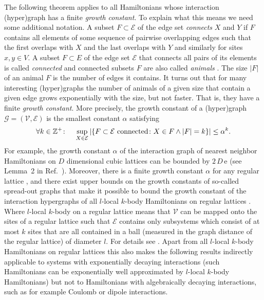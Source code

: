 \documentclass[a4paper,12pt,listof=totoc,index=totoc,bibliography=totoc,headsepline=false,headings=normal,BCOR16.153846mm,DIV12,headinclude,twoside,cleardoublepage=empty,numbers=noenddot,final]{scrreprt}
\theoremstyle{mystyle}
\numberwithin{equation}{section}
\numberwithin{figure}{section}
\numberwithin{lemma}{section}
\numberwithin{theorem}{section}
\numberwithin{corollary}{section}
\numberwithin{definition}{section}
\numberwithin{conjecture}{section}
\numberwithin{observation}{section}
\newcommand{\+}{\mkern2mu}
\newcommand{\oftype}{\colon}
\newcommand{\itholds}{\colon\mathchoice{\quad}{}{}{}}
\newcommand{\animalc}{\alpha}
\newcommand{\Vset}{\mathcal{V}}
\newcommand{\Eset}{\mathcal{E}}
\newcommand{\e}{\mathrm{e}}
\DeclareMathOperator{\1}{\mathds{1}}
\newcommand{\mc}[1]{\mathcal{#1}}
\newcommand{\mcG}{\mc{G}}
\newcommand{\mb}[1]{\mathbb{#1}}
\newcommand{\Z}{\mb{Z}}
\begin{document}
The following theorem applies to all Hamiltonians whose interaction (hyper)graph has a finite \emph{growth constant}.
To explain what this means we need some additional notation.
A subset $F \subset \Eset$ of the edge set \emph{connects} $X$ and $Y$ if $F$ contains all elements of some sequence of pairwise overlapping edges such that the first overlaps with $X$ and the last overlaps with $Y$ and similarly for sites $x,y \in V$.
A subset $F \subset E$ of the edge set $\Eset$ that connects all pairs of its elements is called \emph{connected} and connected subsets $F$ are also called \emph{animals} \cite{Miranda2011,Penrose1994}.
The size $|F|$ of an animal $F$ is the number of edges it contains.
It turns out that for many interesting (hyper)graphs the number of animals of a given size that contain a given edge grows exponentially with the size, but not faster.
That is, they have a finite \emph{growth constant}.
More precisely, the growth constant of a (hyper)graph $\mcG = (\Vset,\Eset)$ is the smallest constant $\animalc$ satisfying
\begin{equation}\label{eq:animal_bound}
  \forall k\in \Z^+\itholds \sup_{X \in \Eset} |\{ F\subset\Eset \text{ connected}\oftype X \in F \land |F|=k \}| \leq \animalc^k .
\end{equation}
For example, the growth constant $\animalc$ of the interaction graph of nearest neighbor Hamiltonians on $D$ dimensional cubic lattices can be bounded by $2\,D\,\e$ (see Lemma~2 in Ref.~\cite{Miranda2011}).
Moreover, there is a finite growth constant $\animalc$ for any regular lattice \cite{Penrose1994}, and there exist upper bounds on the growth constants of so-called spread-out graphs \cite{Miranda2011} that make it possible to bound the growth constant of the interaction hypergraphs of all $l$-local $k$-body Hamiltonians on regular lattices \cite{Kliesch2013a}.
Where $l$-local $k$-body on a regular lattice means that $\Vset$ can be mapped onto the sites of a regular lattice such that $\Eset$ contains only subsystems which consist of at most $k$ sites that are all contained in a ball (measured in the graph distance of the regular lattice) of diameter $l$.
For details see \cite{Kliesch2013a}.
Apart from all $l$-local $k$-body Hamiltonians on regular lattices this also makes the following results indirectly applicable to systems with exponentially decaying interactions (such Hamiltonians can be exponentially well approximated by $l$-local $k$-body Hamiltonians) but not to Hamiltonians with algebraically decaying interactions, such as for example Coulomb or dipole interactions.
\end{document}
